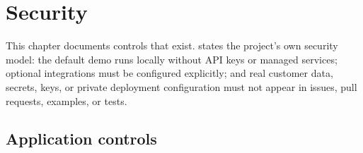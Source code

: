 
\chapter{Security}
\label{ch:security}

This chapter documents controls that exist.  states the
project's own security model: the default demo runs locally without API keys or
managed services; optional integrations must be configured explicitly; and real
customer data, secrets, keys, or private deployment configuration must not
appear in issues, pull requests, examples, or tests.

\section{Application controls}

